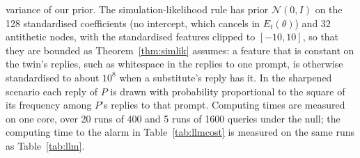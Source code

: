 variance of our prior. The simulation-likelihood rule has prior
$\mathcal N(0, I)$ on the 128 standardised coefficients (no intercept, which
cancels in $E_t(\theta)$) and 32 antithetic nodes, with the standardised
features clipped to $[-10, 10]$, so that they are bounded as
Theorem~\ref{thm:simlik} assumes: a feature that is constant on the twin's
replies, such as whitespace in the replies to one prompt, is otherwise
standardised to about $10^8$ when a substitute's reply has it. In the
sharpened scenario each reply of $P$ is drawn with probability proportional
to the square of its frequency among $P$'s replies to that prompt. Computing
times are measured on one core, over 20 runs of 400 and 5 runs of 1600
queries under the null; the computing time to the alarm in
Table~\ref{tab:llmcost} is measured on the same runs as Table~\ref{tab:llm}.
